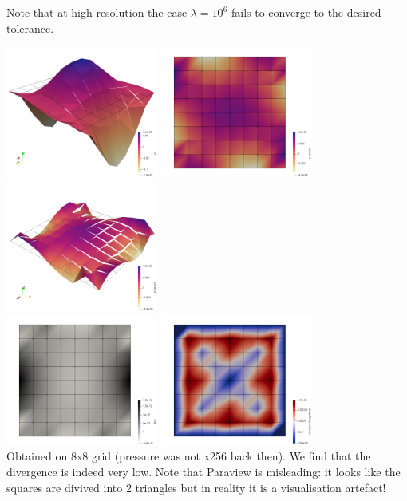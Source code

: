 Note that at high resolution the case $\lambda=10^6$ fails to converge to the 
desired tolerance. 

\begin{center}
\includegraphics[width=5cm]{python_codes/fieldstone_161/results/bench2/press}
\includegraphics[width=5cm]{python_codes/fieldstone_161/results/bench2/press_error}
\includegraphics[width=5cm]{python_codes/fieldstone_161/results/bench2/press_error2}\\
\includegraphics[width=5cm]{python_codes/fieldstone_161/results/bench2/divv}
\includegraphics[width=5cm]{python_codes/fieldstone_161/results/bench2/vel_error}\\
{\captionfont Obtained on 8x8 grid (pressure was not x256 back then). 
We find that the divergence is indeed very low.
Note that Paraview is misleading: it looks like the squares are divived into 2 triangles but
in reality it is a visualisation artefact!}
\end{center}

